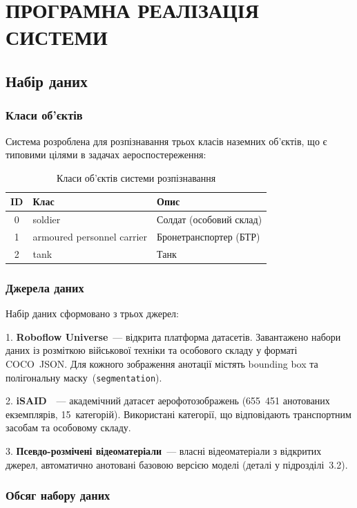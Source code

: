\documentclass[14pt,a4paper]{extreport}
\begin{document}
\chapter{ПРОГРАМНА РЕАЛІЗАЦІЯ СИСТЕМИ}

\section{Набір даних}

\subsection*{Класи об'єктів}

Система розроблена для розпізнавання трьох класів наземних об'єктів,
що є типовими цілями в задачах аероспостереження:

\begin{table}[H]
\caption{Класи об'єктів системи розпізнавання}
\label{tab:classes}
\centering
\begin{tabular}{@{}cll@{}}
\toprule
ID & Клас & Опис \\
\midrule
0 & soldier & Солдат (особовий склад) \\
1 & armoured personnel carrier & Бронетранспортер (БТР) \\
2 & tank & Танк \\
\bottomrule
\end{tabular}
\end{table}

\subsection*{Джерела даних}

Набір даних сформовано з трьох джерел:

1. \textbf{Roboflow Universe}~--- відкрита платформа датасетів.
Завантажено набори даних із розміткою військової техніки та особового
складу у форматі COCO~JSON. Для кожного зображення анотації містять
bounding box та полігональну маску~(\texttt{segmentation}).

2. \textbf{iSAID}~\cite{isaid2019}~--- академічний датасет
аерофотозображень (655~451 анотованих екземплярів, 15~категорій).
Використані категорії, що відповідають транспортним засобам та
особовому складу.

3. \textbf{Псевдо-розмічені відеоматеріали}~--- власні відеоматеріали
з відкритих джерел, автоматично анотовані базовою версією моделі
(деталі у підрозділі~3.2).

\subsection*{Обсяг набору даних}
\end{document}
